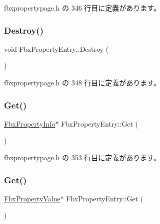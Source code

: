  fbxpropertypage.\+h の 346 行目に定義があります。

\mbox{\label{class_fbx_property_entry_af8621889726e9c80d78bfabc039720dc}} 
\subsubsection{\texorpdfstring{Destroy()}{Destroy()}}
{\footnotesize\ttfamily void Fbx\+Property\+Entry\+::\+Destroy (\begin{DoxyParamCaption}{ }\end{DoxyParamCaption})\hspace{0.3cm}{\ttfamily [inline]}}



 fbxpropertypage.\+h の 348 行目に定義があります。

\mbox{\label{class_fbx_property_entry_ae91a2951a81cd0906ffa15c6d7c9abe4}} 
\subsubsection{\texorpdfstring{Get()}{Get()}\hspace{0.1cm}{\footnotesize\ttfamily [1/4]}}
{\footnotesize\ttfamily \hyperlink{class_fbx_property_info}{Fbx\+Property\+Info}$\ast$ Fbx\+Property\+Entry\+::\+Get (\begin{DoxyParamCaption}\item[{const \hyperlink{class_fbx_property_info}{Fbx\+Property\+Info} $\ast$}]{ }\end{DoxyParamCaption})\hspace{0.3cm}{\ttfamily [inline]}}



 fbxpropertypage.\+h の 353 行目に定義があります。

\mbox{\label{class_fbx_property_entry_a61efc16c6ef16db699eb98349d8a80db}} 
\subsubsection{\texorpdfstring{Get()}{Get()}\hspace{0.1cm}{\footnotesize\ttfamily [2/4]}}
{\footnotesize\ttfamily \hyperlink{class_fbx_property_value}{Fbx\+Property\+Value}$\ast$ Fbx\+Property\+Entry\+::\+Get (\begin{DoxyParamCaption}\item[{const \hyperlink{class_fbx_property_value}{Fbx\+Property\+Value} $\ast$}]{ }\end{DoxyParamCaption})\hspace{0.3cm}{\ttfamily [inline]}}



